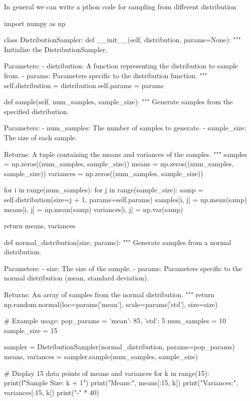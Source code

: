 \documentclass[12pt,a4paper]{article}
\theoremstyle{example}
\theoremstyle{definition}
\theoremstyle{theorem}
\begin{document}
In general we can write a pthon code for sampling from different distribution
\begin{python}
import numpy as np

class DistributionSampler:
    def __init__(self, distribution, params=None):
        """
        Initialize the DistributionSampler.

        Parameters:
        - distribution: A function representing the distribution to sample from.
        - params: Parameters specific to the distribution function.
        """
        self.distribution = distribution
        self.params = params

    def sample(self, num_samples, sample_size):
        """
        Generate samples from the specified distribution.

        Parameters:
        - num_samples: The number of samples to generate.
        - sample_size: The size of each sample.

        Returns:
        A tuple containing the means and variances of the samples.
        """
        samples = np.zeros((num_samples, sample_size))
        means = np.zeros((num_samples, sample_size))
        variances = np.zeros((num_samples, sample_size))

        for i in range(num_samples):
            for j in range(sample_size):
                samp = self.distribution(size=j + 1, params=self.params)
                samples[i, j] = np.mean(samp)
                means[i, j] = np.mean(samp)
                variances[i, j] = np.var(samp)

        return means, variances


def normal_distribution(size, params):
    """
    Generate samples from a normal distribution.

    Parameters:
    - size: The size of the sample.
    - params: Parameters specific to the normal distribution (mean, standard deviation).

    Returns:
    An array of samples from the normal distribution.
    """
    return np.random.normal(loc=params['mean'], scale=params['std'], size=size)


# Example usage:
pop_params = {'mean': 85, 'std': 5}
num_samples = 10
sample_size = 15

sampler = DistributionSampler(normal_distribution, params=pop_params)
means, variances = sampler.sample(num_samples, sample_size)

# Display 15 data points of means and variances
for k in range(15):
    print(f"Sample Size: {k + 1}")
    print("Means:", means[:15, k])
    print("Variances:", variances[:15, k])
    print("-" * 40)

\end{python}
\end{document}

